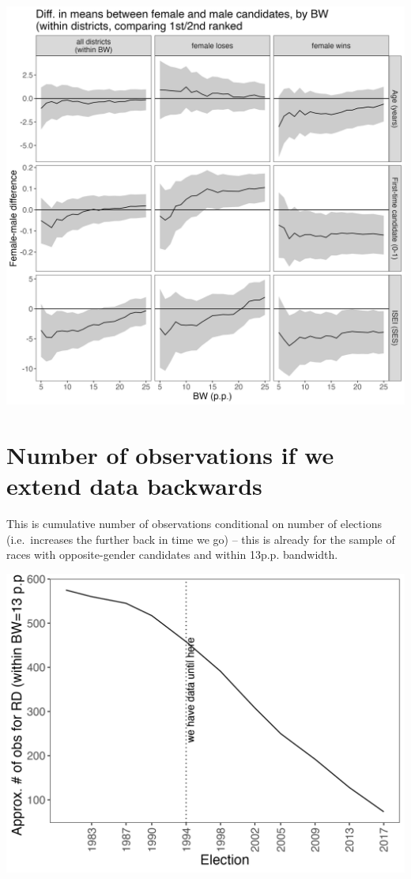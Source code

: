 \documentclass[
  letterpaper,
  DIV=11,
  numbers=noendperiod]{scrartcl}
\begin{document}
\includegraphics{images/Balance_WithinDist.png}

\hypertarget{number-of-observations-if-we-extend-data-backwards}{%
\section{Number of observations if we extend data
backwards}\label{number-of-observations-if-we-extend-data-backwards}}

This is cumulative number of observations conditional on number of
elections (i.e.~increases the further back in time we go) -- this is
already for the sample of races with opposite-gender candidates and
within 13p.p. bandwidth.

\includegraphics{images/Obs.png}
\end{document}
